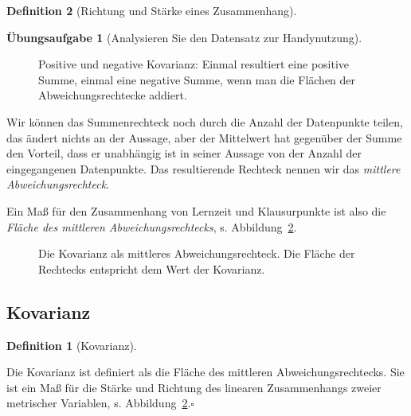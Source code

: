 \documentclass[
  a4paper,
  DIV=11]{scrreprt}
\theoremstyle{definition}
\newtheorem{exercise}{Übungsaufgabe}[chapter]
\theoremstyle{definition}
\theoremstyle{definition}
\newtheorem{definition}{Definition}[chapter]
\theoremstyle{remark}
\begin{document}
\begin{definition}[Richtung und Stärke eines
Zusammenhang]
\begin{exercise}[Analysieren Sie den Datensatz zur
Handynutzung]
\begin{figure}
\caption{\label{fig-kov}Positive und negative Kovarianz: Einmal
resultiert eine positive Summe, einmal eine negative Summe, wenn man die
Flächen der Abweichungsrechtecke addiert.}

\end{figure}%

Wir können das Summenrechteck noch durch die Anzahl der Datenpunkte
teilen, das ändert nichts an der Aussage, aber der Mittelwert hat
gegenüber der Summe den Vorteil, dass er unabhängig ist in seiner
Aussage von der Anzahl der eingegangenen Datenpunkte. Das resultierende
Rechteck nennen wir das \emph{mittlere Abweichungsrechteck}.

Ein Maß für den Zusammenhang von Lernzeit und Klausurpunkte ist also die
\emph{Fläche des mittleren Abweichungsrechtecks}, s.
Abbildung~\ref{fig-cov2}.

\begin{figure}


\caption{\label{fig-cov2}Die Kovarianz als mittleres
Abweichungsrechteck. Die Fläche der Rechtecks entspricht dem Wert der
Kovarianz.}

\end{figure}%

\subsection{Kovarianz}\label{sec-kov}

\begin{definition}[Kovarianz]\protect\hypertarget{def-kov}{}\label{def-kov}

Die Kovarianz ist definiert als die Fläche des mittleren
Abweichungsrechtecks. Sie ist ein Maß für die Stärke und Richtung des
linearen Zusammenhangs zweier metrischer Variablen, s.
Abbildung~\ref{fig-cov2}.\(\square\)


\end{definition}
\end{exercise}
\end{definition}
\end{document}
